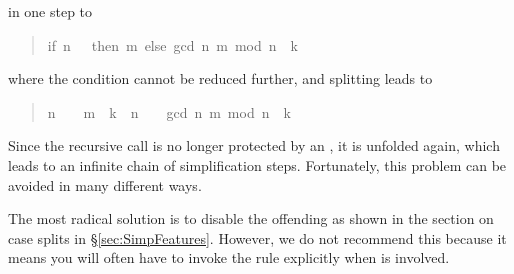 \begin{isabellebody}
\begin{isamarkuptext}
\begin{quote}
\end{quote}
in one step to
\begin{quote}

\begin{isabelle}%
{\isacharparenleft}if\ \mbox{n}\ {\isacharequal}\ \ then\ \mbox{m}\ else\ gcd\ {\isacharparenleft}\mbox{n}{\isacharcomma}\ \mbox{m}\ mod\ \mbox{n}{\isacharparenright}{\isacharparenright}\ {\isacharequal}\ \mbox{k}
\end{isabelle}%

\end{quote}
where the condition cannot be reduced further, and splitting leads to
\begin{quote}

\begin{isabelle}%
{\isacharparenleft}\mbox{n}\ {\isacharequal}\ \ {\isasymlongrightarrow}\ \mbox{m}\ {\isacharequal}\ \mbox{k}{\isacharparenright}\ {\isasymand}\ {\isacharparenleft}\mbox{n}\ {\isasymnoteq}\ \ {\isasymlongrightarrow}\ gcd\ {\isacharparenleft}\mbox{n}{\isacharcomma}\ \mbox{m}\ mod\ \mbox{n}{\isacharparenright}\ {\isacharequal}\ \mbox{k}{\isacharparenright}
\end{isabelle}%

\end{quote}
Since the recursive call  is no longer protected by
an , it is unfolded again, which leads to an infinite chain of
simplification steps. Fortunately, this problem can be avoided in many
different ways.

The most radical solution is to disable the offending
 as shown in the section on case splits in
\S\ref{sec:SimpFeatures}.
However, we do not recommend this because it means you will often have to
invoke the rule explicitly when  is involved.


\end{isamarkuptext}
\end{isabellebody}
